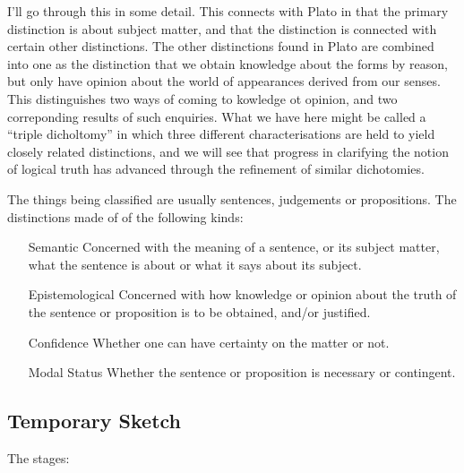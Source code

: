 \documentclass[10pt,titlepage]{article}
\begin{document}
I'll go through this in some detail.
This connects with Plato in that the primary distinction is about subject matter, and that the distinction is connected with certain other distinctions.
The other distinctions found in Plato are combined into one as the distinction that 
we obtain knowledge about the forms by reason, but only have opinion about the world of appearances derived from our senses.
This distinguishes two ways of coming to kowledge ot opinion, and two correponding results of such enquiries.
What we have here might be called a ``triple dicholtomy'' in which three different characterisations are held to yield closely related distinctions, and we will see that progress in clarifying the notion of logical truth has advanced through the refinement of similar dichotomies.

The things being classified are usually sentences, judgements or propositions.
The distinctions made of of the following kinds:
\begin{itemize}

\item[Semantic] Concerned with the meaning of a sentence, or its subject matter, what the sentence is about or what it says about its subject.
  
\item[Epistemological] Concerned with how knowledge or opinion about the truth of the sentence or proposition is to be obtained, and/or justified.

\item[Confidence] Whether one can have certainty on the matter or not.

\item[Modal Status] Whether the sentence or proposition is necessary or contingent.
  
\end{itemize}


\subsection{Temporary Sketch}

The stages:
\end{document}
